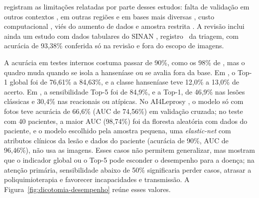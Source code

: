  registram as limitações relatadas por parte
desses estudos: falta de validação em outros contextos \cite{baweja2023}, em
outras regiões \cite{banerjee2023} e em bases mais diversas
\cite{barbieri2022}, custo computacional \cite{nyatte2022}, viés do
aumento de dados \cite{jaikishore2021} e amostra restrita
\cite{beesetty2023}. A revisão inclui ainda um estudo com dados tabulares
do SINAN \cite{souza2021}, registro~ da triagem, com acurácia de
93,38\% conferida só na revisão e fora do escopo de imagens.

A acurácia em testes internos costuma passar de 90\%, como os 98\% de
, mas o quadro muda quando se isola a hanseníase
ou se avalia fora da base. Em , o Top-1 global foi
de 76,61\% a 84,63\%, e a classe hanseníase teve 12,0\% a 13,0\% de
acerto. Em , a sensibilidade Top-5 foi de 84,9\%, e a
Top-1, de 46,9\% nas lesões clássicas e 30,4\% nas reacionais ou atípicas.
No AI4Leprosy \cite{barbieri2022}, o modelo só com fotos teve acurácia de
66,6\% (AUC de 74,56\%) em validação cruzada; no teste com 40 pacientes, a
maior AUC (98,74\%) foi da floresta aleatória com dados do paciente, e o
modelo escolhido pela amostra pequena, uma \textit{elastic-net} com
atributos clínicos da lesão e dados do paciente (acurácia de 90\%, AUC de
96,46\%), não usa as imagens. Esses casos não permitem generalizar, mas
mostram que o indicador global ou o Top-5 pode esconder o desempenho para
a doença; na atenção primária, sensibilidade abaixo de 50\% significaria
perder casos, atrasar a poliquimioterapia e favorecer incapacidades e
transmissão. A Figura~\ref{fig:dicotomia-desempenho} reúne esses
valores.

